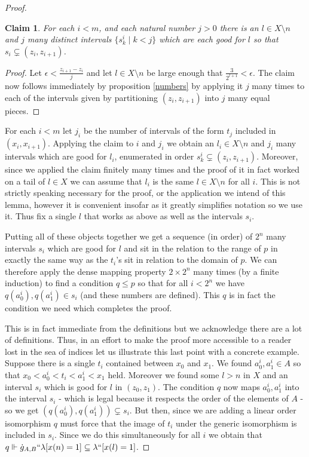 \documentclass[leqno,11pt]{amsart}
\newtheorem{claim}[theorem]{Claim}
\theoremstyle{definition}
\theoremstyle{remark}
\def\forces{\Vdash}
\begin{document}
\begin{proof}
\begin{claim}
    For each $i < m$, and each natural number $j > 0$ there is an $l \in X \setminus n$ and $j$ many distinct intervals $\{s^i_k \mid k < j\}$ which are each good for $l$ so that $s_i \subsetneq (z_{i}, z_{{i}+1})$.
\end{claim}

\begin{proof}
    Let $\epsilon < \frac{z_{i+1} - z_{i}}{j}$ and let $l \in X\setminus n$ be large enough that $\frac{3}{2^{l+1}} < \epsilon$. The claim now follows immediately by proposition \ref{numbers} by applying it $j$ many times to each of the intervals given by partitioning $(z_{i}, z_{i + 1})$ into $j$ many equal pieces. 
\end{proof}
For each $i < m$ let $j_i$ be the number of intervals of the form $t_j$ included in $(x_{i}, x_{i + 1})$. Applying the claim to $i$ and $j_i$ we obtain an $l_i \in X \setminus n$ and $j_i$ many intervals which are good for $l_i$, enumerated in order $s^i_{k} \subsetneq (z_{i}, z_{{i}+1})$. Moreover, since we applied the claim finitely many times and the proof of it in fact worked on a tail of $l\in X$ we can assume that $l_i$ is the same $l \in X \setminus n$ for all $i$. This is not strictly speaking necessary for the proof, or the application we intend of this lemma, however it is convenient insofar as it greatly simplifies notation so we use it. Thus fix a single $l$ that works as above as well as the intervals $s_i$. 

Putting all of these objects together we get a sequence (in order) of $2^{n}$ many intervals $s_i$ which are good for $l$ and sit in the relation to the range of $p$ in exactly the same way as the $t_i$'s sit in relation to the domain of $p$. We can therefore apply the dense mapping property $2 \times 2^n$ many times (by a finite induction) to find a condition $q \leq p$ so that for all $i < 2^n$ we have $q(a^i_0), q(a^i_1) \in s_i$ (and these numbers are defined). This $q$ is in fact the condition we need which completes the proof. 

This is in fact immediate from the definitions but we acknowledge there are a lot of definitions. Thus, in an effort to make the proof more accessible to a reader lost in the sea of indices let us illustrate this last point with a concrete example. Suppose there is a single $t_i$ contained between $x_0$ and $x_1$. We found $a^i_0, a^i_1\in A$ so that $x_0 < a^i_0 < t_i < a^i_1 < x_1$ held. Moreover we found some $l > n$ in $X$ and an interval $s_i$ which is good for $l$ in $(z_0, z_1)$. The condition $q$ now maps $a^i_0, a^i_1$ into the interval $s_i$ - which is legal because it respects the order of the elements of $A$ - so we get $(q(a^i_0), q(a^i_1)) \subsetneq s_i$. But then, since we are adding a linear order isomorphism $q$ must force that the image of $t_i$ under the generic isomorphism is included in $s_i$. Since we do this simultaneously for all $i$ we obtain that $q \forces \dot{g}_{A, B}``\lambda [x(n) = 1] \subseteq \lambda ``[x(l)= 1]$. 
\end{proof}
\end{document}
